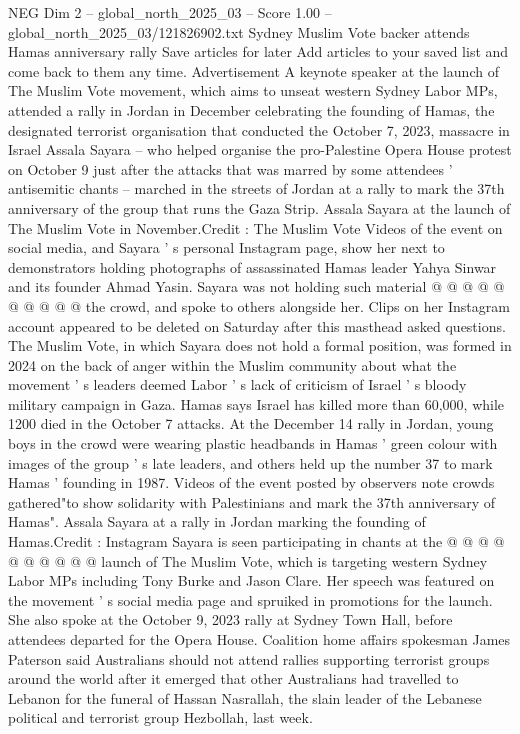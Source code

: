 \begin{textsample}{NEG Dim 2 – global\_north\_2025\_03 – Score 1.00 – global\_north\_2025\_03/121826902.txt}  \label{ex:f2_neg_042}
Sydney Muslim Vote backer attends Hamas anniversary rally Save articles for later Add articles to your saved list and come back to them any time.
Advertisement A keynote speaker at the launch of The Muslim Vote movement, which aims to unseat western Sydney Labor MPs, attended a rally in Jordan in December celebrating the founding of Hamas, the designated terrorist organisation that conducted the October 7, 2023, massacre in Israel Assala Sayara -- who helped organise the pro-Palestine Opera House protest on October 9 just after the attacks that was marred by some attendees ' antisemitic chants -- marched in the streets of Jordan at a rally to mark the 37th anniversary of the group that runs the Gaza Strip.
Assala Sayara at the launch of The Muslim Vote in November.Credit : The Muslim Vote Videos of the event on social media, and Sayara ' s personal Instagram page, show her next to demonstrators holding photographs of assassinated Hamas leader Yahya Sinwar and its founder Ahmad Yasin.
Sayara was not holding such material @ @ @ @ @ @ @ @ @ @ the crowd, and spoke to others alongside her.
Clips on her Instagram account appeared to be deleted on Saturday after this masthead asked questions.
The Muslim Vote, in which Sayara does not hold a formal position, was formed in 2024 on the back of anger within the Muslim community about what the movement ' s leaders deemed Labor ' s lack of criticism of Israel ' s bloody military campaign in Gaza.
Hamas says Israel has killed more than 60,000, while 1200 died in the October 7 attacks.
At the December 14 rally in Jordan, young boys in the crowd were wearing plastic headbands in Hamas ' green colour with images of the group ' s late leaders, and others held up the number 37 to mark Hamas ' founding in 1987.
Videos of the event posted by observers note crowds gathered"to show solidarity with Palestinians and mark the 37th anniversary of Hamas".
Assala Sayara at a rally in Jordan marking the founding of Hamas.Credit : Instagram Sayara is seen participating in chants at the @ @ @ @ @ @ @ @ @ @ launch of The Muslim Vote, which is targeting western Sydney Labor MPs including Tony Burke and Jason Clare.
Her speech was featured on the movement ' s social media page and spruiked in promotions for the launch.
She also spoke at the October 9, 2023 rally at Sydney Town Hall, before attendees departed for the Opera House.
Coalition home affairs spokesman James Paterson said Australians should not attend rallies supporting terrorist groups around the world after it emerged that other Australians had travelled to Lebanon for the funeral of Hassan Nasrallah, the slain leader of the Lebanese political and terrorist group Hezbollah, last week.

\end{textsample}

